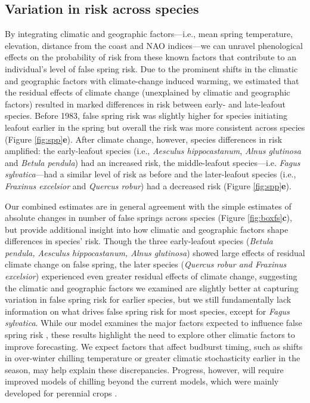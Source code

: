 \documentclass{article}\usepackage[]{graphicx}\usepackage[]{color}
\begin{document}
\subsection*{Variation in risk across species} 
By integrating climatic and geographic factors---i.e., mean spring temperature, elevation, distance from the coast and NAO indices---we can unravel phenological effects on the probability of risk from these known factors that contribute to an individual's level of false spring risk. Due to the prominent shifts in the climatic and geographic factors with climate-change induced warming, we estimated that the residual effects of climate change (unexplained by climatic and geographic factors) resulted in marked differences in risk between early- and late-leafout species. Before 1983, false spring risk was slightly higher for species initiating leafout earlier in the spring but overall the risk was more consistent across species (Figure \ref{fig:spp}\textbf{e}). After climate change, however, species differences in risk amplified: the early-leafout species (i.e., \textit{Aesculus hippocastanum}, \textit{Alnus glutinosa} and \textit{Betula pendula}) had an increased risk, the middle-leafout species---i.e. \textit{Fagus sylvatica}---had a similar level of risk as before and the later-leafout species (i.e., \textit{Fraxinus excelsior} and \textit{Quercus robur}) had a decreased risk (Figure \ref{fig:spp}\textbf{e}). 

Our combined estimates are in general agreement with the simple estimates of absolute changes in number of false springs across species (Figure \ref{fig:boxfs}\textbf{c}), but provide additional insight into how climatic and geographic factors shape differences in species' risk.  Though the three early-leafout species (\textit{Betula pendula, Aesculus hippocastanum, Alnus glutinosa}) showed large effects of residual climate change on false spring, the later species (\textit{Quercus robur and Fraxinus excelsior}) experienced even greater residual effects of climate change, suggesting the climatic and geographic factors we examined are slightly better at capturing variation in false spring risk for earlier species, but we still fundamentally lack information on what drives false spring risk for most species, except for \textit{Fagus sylvatica}. While our model examines the major factors expected to influence false spring risk \citep{Wypych2016a,Liu2018,Ma2018,Vitasse2018}, these results highlight the need to explore other climatic factors to improve forecasting. We expect factors that affect budburst timing, such as shifts in over-winter chilling temperature or greater climatic stochasticity earlier in the season, may help explain these discrepancies. Progress, however, will require improved models of chilling beyond the current models, which were mainly developed for perennial crops \citep{Dennis2003,Luedeling2011}. 
\end{document}
